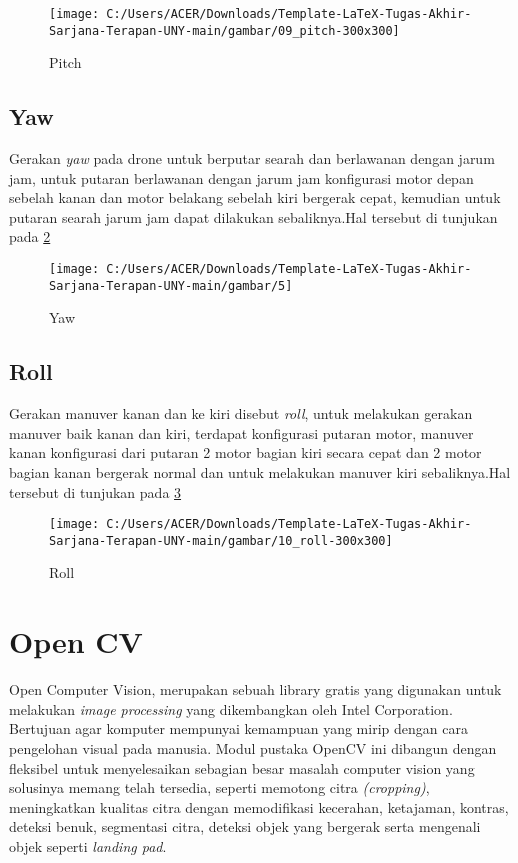 \begin{figure}[H]
	\centering
	\texttt{[image: C:/Users/ACER/Downloads/Template-LaTeX-Tugas-Akhir-Sarjana-Terapan-UNY-main/gambar/09\_pitch-300x300]}
	\caption{Pitch}
	\label{fig:09pitch-300x300}
\end{figure}

\subsection{Yaw}
Gerakan \textit{yaw} pada drone untuk berputar searah dan berlawanan dengan jarum jam, untuk putaran berlawanan dengan jarum jam konfigurasi motor depan sebelah kanan dan motor belakang sebelah kiri bergerak cepat, kemudian untuk putaran searah jarum jam dapat dilakukan sebaliknya\cite{quan2020multicopter}.Hal tersebut di tunjukan pada \cref{fig:5}

\begin{figure}[H]
	\centering
	\texttt{[image: C:/Users/ACER/Downloads/Template-LaTeX-Tugas-Akhir-Sarjana-Terapan-UNY-main/gambar/5]}
	\caption{Yaw}
	\label{fig:5}
\end{figure}


\subsection{Roll}
Gerakan manuver kanan dan ke kiri disebut \textit{roll}, untuk melakukan gerakan manuver baik kanan dan kiri, terdapat konfigurasi putaran motor, manuver kanan konfigurasi dari putaran 2 motor bagian kiri secara cepat dan 2 motor bagian kanan bergerak normal dan untuk melakukan manuver kiri sebaliknya\cite{quan2020multicopter}.Hal tersebut di tunjukan pada \cref{fig:10roll-300x300}

\begin{figure}[H]
	\centering
	\texttt{[image: C:/Users/ACER/Downloads/Template-LaTeX-Tugas-Akhir-Sarjana-Terapan-UNY-main/gambar/10\_roll-300x300]}
	\caption{Roll}
	\label{fig:10roll-300x300}
\end{figure}

\section{Open CV}
Open Computer Vision, merupakan sebuah library gratis yang digunakan untuk melakukan \textit{image processing} yang dikembangkan oleh Intel Corporation. Bertujuan agar komputer mempunyai kemampuan yang mirip dengan cara pengelohan visual pada manusia. Modul pustaka OpenCV ini dibangun dengan fleksibel untuk menyelesaikan sebagian besar masalah computer vision yang solusinya memang telah tersedia, seperti memotong citra \textit{(cropping)}, meningkatkan kualitas citra dengan memodifikasi kecerahan, ketajaman, kontras, deteksi benuk, segmentasi citra, deteksi objek yang bergerak serta mengenali objek seperti \textit{landing pad}\cite{ratna2020pengolahan}.

